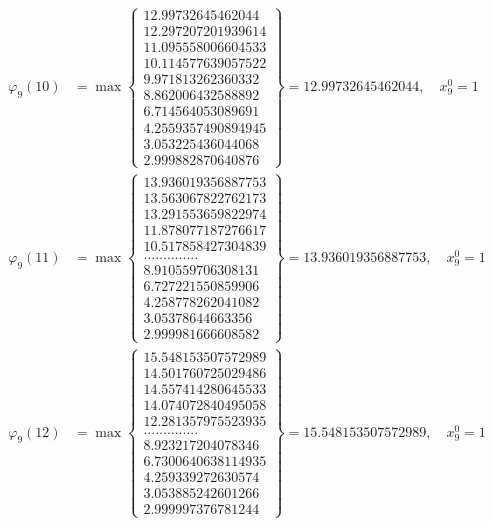 \documentclass{article}
\begin{document}
\begin{align*}
  
  
  
\varphi_{9}(10) &= \max \left\{ \begin{array}{c}
12.99732645462044 \\
 12.297207201939614 \\
 11.095558006604533 \\
 10.114577639057522 \\
 9.971813262360332 \\
 8.862006432588892 \\
 6.714564053089691 \\
 4.2559357490894945 \\
 3.053225436044068 \\
 2.999882870640876
\end{array} \right\} = 12.99732645462044, \quad x_{9}^0 = 1\\
  
  
  
  
\varphi_{9}(11) &= \max \left\{ \begin{array}{c}
13.936019356887753 \\
 13.563067822762173 \\
 13.291553659822974 \\
 11.878077187276617 \\
 10.517858427304839 \\
 .............. \\
 8.910559706308131 \\
 6.727221550859906 \\
 4.258778262041082 \\
 3.05378644663356 \\
 2.999981666608582
\end{array} \right\} = 13.936019356887753, \quad x_{9}^0 = 1\\
  
  
  
  
\varphi_{9}(12) &= \max \left\{ \begin{array}{c}
15.548153507572989 \\
 14.501760725029486 \\
 14.557414280645533 \\
 14.074072840495058 \\
 12.281357975523935 \\
 .............. \\
 8.923217204078346 \\
 6.7300640638114935 \\
 4.259339272630574 \\
 3.053885242601266 \\
 2.999997376781244
\end{array} \right\} = 15.548153507572989, \quad x_{9}^0 = 1\\
  

\end{align*}
\end{document}
